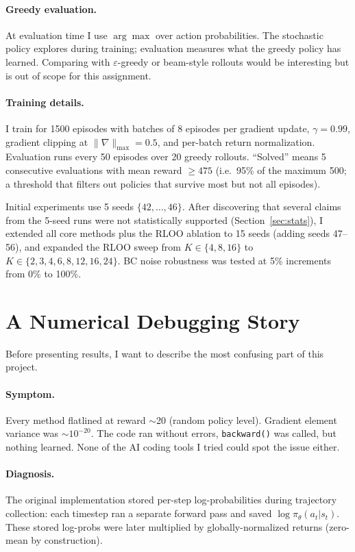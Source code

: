 \documentclass{article}
\begin{document}
\paragraph{Greedy evaluation.}
At evaluation time I use $\arg\max$ over action probabilities.
The stochastic policy explores during training; evaluation measures what the greedy policy has learned.
Comparing with $\varepsilon$-greedy or beam-style rollouts would be interesting but is out of scope for this assignment.

\paragraph{Training details.}
I train for 1500 episodes with batches of 8 episodes per gradient update, $\gamma = 0.99$, gradient clipping at $\|\nabla\|_{\max} = 0.5$, and per-batch return normalization.
Evaluation runs every 50 episodes over 20 greedy rollouts.
``Solved'' means 5 consecutive evaluations with mean reward $\geq 475$ (i.e.\ 95\% of the maximum 500; a threshold that filters out policies that survive most but not all episodes).

Initial experiments use 5 seeds $\{42, \ldots, 46\}$.
After discovering that several claims from the 5-seed runs were not statistically supported (Section~\ref{sec:stats}), I extended all core methods plus the RLOO ablation to 15 seeds (adding seeds 47--56), and expanded the RLOO sweep from $K \in \{4, 8, 16\}$ to $K \in \{2, 3, 4, 6, 8, 12, 16, 24\}$.
BC noise robustness was tested at 5\% increments from 0\% to 100\%.

\section{A Numerical Debugging Story}
\label{sec:bug}

Before presenting results, I want to describe the most confusing part of this project.

\paragraph{Symptom.}
Every method flatlined at reward $\sim$20 (random policy level).
Gradient element variance was ${\sim}10^{-20}$.
The code ran without errors, \texttt{backward()} was called, but nothing learned.
None of the AI coding tools I tried could spot the issue either.

\paragraph{Diagnosis.}
The original implementation stored per-step log-probabilities during trajectory collection: each timestep ran a separate forward pass and saved $\log \pi_\theta(a_t | s_t)$.
These stored log-probs were later multiplied by globally-normalized returns (zero-mean by construction).
\end{document}
